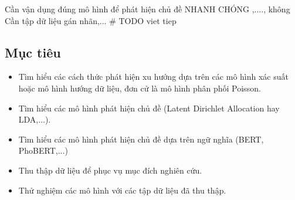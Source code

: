 Cần vận dụng đúng mô hình để phát hiện chủ đề NHANH CHÓNG ,...., không Cần
tập dữ liệu gán nhãn,...
\# TODO viet tiep

\subsection{Mục tiêu}
\begin{itemize}
	\item Tìm hiểu các cách thức phát hiện xu hướng dựa trên các mô hình xác
		suất hoặc mô hình hướng dữ liệu, đơn cử là mô hình phân phối Poisson.

	\item Tìm hiểu các mô hình phát hiện chủ đề (Latent Dirichlet Allocation
		hay LDA,...).

	\item Tìm hiểu các mô hình phát hiện chủ đề dựa trên ngữ nghĩa (BERT,
		PhoBERT,...)
	
	\item Thu thập dữ liệu để phục vụ mục đích nghiên cứu.
	
	\item Thử nghiệm các mô hình với các tập dữ liệu đã thu thập.
\end{itemize}
